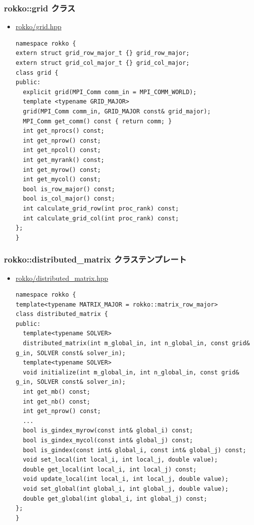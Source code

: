 \begin{frame}[c,fragile]
  \frametitle{rokko::grid クラス}
  \begin{itemize}
  \item \href{https://github.com/t-sakashita/rokko/blob/master/rokko/grid.hpp}{rokko/grid.hpp}
\begin{lstlisting}
namespace rokko {
extern struct grid_row_major_t {} grid_row_major;
extern struct grid_col_major_t {} grid_col_major;
class grid {
public:
  explicit grid(MPI_Comm comm_in = MPI_COMM_WORLD);
  template <typename GRID_MAJOR>
  grid(MPI_Comm comm_in, GRID_MAJOR const& grid_major);
  MPI_Comm get_comm() const { return comm; }
  int get_nprocs() const;
  int get_nprow() const;
  int get_npcol() const;
  int get_myrank() const;
  int get_myrow() const;
  int get_mycol() const;
  bool is_row_major() const;
  bool is_col_major() const;
  int calculate_grid_row(int proc_rank) const;
  int calculate_grid_col(int proc_rank) const;
};
}
\end{lstlisting}
  \end{itemize}
\end{frame}


\begin{frame}[c,fragile]
  \frametitle{rokko::distributed\_matrix クラステンプレート}
  \begin{itemize}
  \item \href{https://github.com/t-sakashita/rokko/blob/master/rokko/distributed_matrix.hpp}{rokko/distributed\_matrix.hpp}
\begin{lstlisting}
namespace rokko {
template<typename MATRIX_MAJOR = rokko::matrix_row_major>
class distributed_matrix {
public:
  template<typename SOLVER>
  distributed_matrix(int m_global_in, int n_global_in, const grid& g_in, SOLVER const& solver_in);
  template<typename SOLVER>
  void initialize(int m_global_in, int n_global_in, const grid& g_in, SOLVER const& solver_in);
  int get_mb() const;
  int get_nb() const;
  int get_nprow() const;
  ...
  bool is_gindex_myrow(const int& global_i) const;
  bool is_gindex_mycol(const int& global_j) const;
  bool is_gindex(const int& global_i, const int& global_j) const;
  void set_local(int local_i, int local_j, double value);
  double get_local(int local_i, int local_j) const;
  void update_local(int local_i, int local_j, double value);
  void set_global(int global_i, int global_j, double value);
  double get_global(int global_i, int global_j) const;
};
}
\end{lstlisting}
  \end{itemize}
\end{frame}

